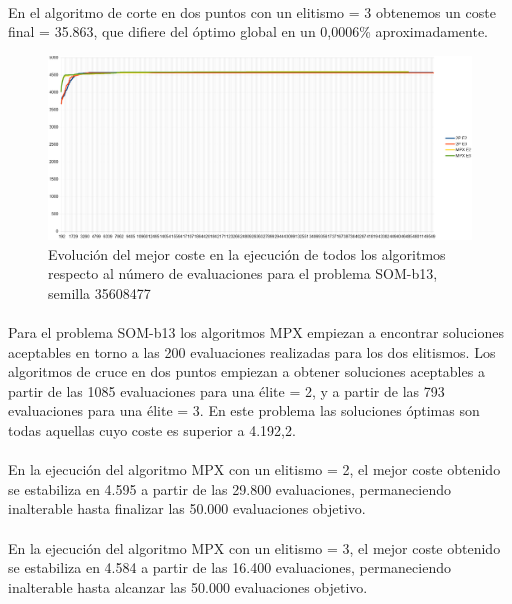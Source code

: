 	\paragraph{}En el algoritmo de corte en dos puntos con un elitismo = 3 obtenemos un coste final = 35.863, que difiere del óptimo global en un 0,0006\% aproximadamente.

	\begin{figure}[H]
		\centering
		\includegraphics[scale=0.3]{img/35608477_SOM-b_13_n300_m90.png}
		\caption{Evolución del mejor coste en la ejecución de todos los algoritmos respecto al número de evaluaciones para el problema SOM-b13, semilla 35608477}
		\label{SOM-b_13_historico}
	\end{figure}

	\paragraph{}Para el problema SOM-b13 los algoritmos MPX empiezan a encontrar soluciones aceptables en torno a las 200 evaluaciones realizadas para los dos elitismos. Los algoritmos de cruce en dos puntos empiezan a obtener soluciones aceptables a partir de las 1085 evaluaciones para una élite = 2, y a partir de las 793 evaluaciones para una élite = 3. En este problema las soluciones óptimas son todas aquellas cuyo coste es superior a 4.192,2.
	
	\paragraph{}En la ejecución del algoritmo MPX con un elitismo = 2, el mejor coste obtenido se estabiliza en 4.595 a partir de las 29.800 evaluaciones, permaneciendo inalterable hasta finalizar las 50.000 evaluaciones objetivo. 
	
	\paragraph{}En la ejecución del algoritmo MPX con un elitismo = 3, el mejor coste obtenido se estabiliza en 4.584 a partir de las 16.400 evaluaciones, permaneciendo inalterable hasta alcanzar las 50.000 evaluaciones objetivo.
	
